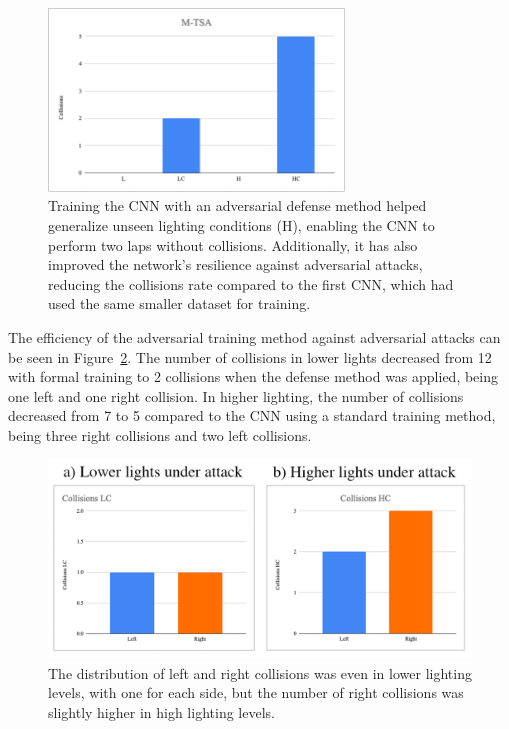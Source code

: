 \documentclass[12pt]{article}
\begin{document}
\begin{figure}[H]
\begin{center}
\includegraphics[width=0.7\textwidth]{figures/mtsa-collisions-total.png}
\caption{Training the CNN with an adversarial defense method helped generalize unseen lighting conditions (H), enabling the CNN to perform two laps without collisions. Additionally, it has also improved the network's resilience against adversarial attacks, reducing the collisions rate compared to the first CNN, which had used the same smaller dataset for training.}
\label{fig:mtsacollisions}
\end{center}
\end{figure}

The efficiency of the adversarial training method against adversarial attacks can be seen in Figure~\ref{fig:mtsaleftright}. The number of collisions in lower lights decreased from 12 with formal training to 2 collisions when the defense method was applied, being one left and one right collision. In higher lighting, the number of collisions decreased from 7 to 5 compared to the CNN using a standard training method, being three right collisions and two left collisions.   

\begin{figure}[H]
\begin{center}
\includegraphics[width=1.0\textwidth]{figures/mtsaleftrightcollisions.png}
\caption{ The distribution of left and right collisions was even in lower lighting levels, with one for each side, but the number of right collisions was slightly higher in high lighting levels.  }
\label{fig:mtsaleftright}
\end{center}
\end{figure}
\end{document}
